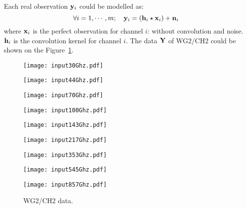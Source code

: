 Each real observation ${\bf y}_i$ could be modelled as:
\begin{equation}
\forall i=1,\cdots,m; \quad {\bf y}_i = \left( {\bf h}_i \star {\bf x}_i\right) + {\bf n}_i
\end{equation}
where ${\bf x}_i$ is the perfect observation for channel $i$: without convolution and noise. ${\bf h}_i$ is the convolution kernel for channel $i$. The data $\bf Y$ of WG2/CH2 could be shown 
on the Figure~\ref{fig:data_wg2}.

\begin{figure}[htb]
\vfill
\hspace{0.1in}
\begin{minipage}[b]{0.5\linewidth}
    \centerline{\texttt{[image: input30Ghz.pdf]}}
\end{minipage}
\hfill
\begin{minipage}[b]{0.5\linewidth}
    \centerline{\texttt{[image: input44Ghz.pdf]}}
\end{minipage}
\vfill
\hspace{0.1in}
\begin{minipage}[b]{0,5\linewidth}
    \centerline{\texttt{[image: input70Ghz.pdf]}}
\end{minipage}
\hfill
\begin{minipage}[b]{0,5\linewidth}
    \centerline{\texttt{[image: input100Ghz.pdf]}}
\end{minipage}
\vfill
\hspace{0.1in}
\begin{minipage}[b]{0,5\linewidth}
    \centerline{\texttt{[image: input143Ghz.pdf]}}
\end{minipage}
\hfill
\begin{minipage}[b]{0,5\linewidth}
    \centerline{\texttt{[image: input217Ghz.pdf]}}
\end{minipage}
\vspace{-0.1in} 
\vfill
\hspace{0.1in}
\begin{minipage}[b]{0,5\linewidth}
    \centerline{\texttt{[image: input353Ghz.pdf]}}
\end{minipage}
\hfill
\begin{minipage}[b]{0,5\linewidth}
    \centerline{\texttt{[image: input545Ghz.pdf]}}
\end{minipage}
\vspace{-0.1in} 
\vfill
\begin{minipage}[b]{1\linewidth}
    \centerline{\texttt{[image: input857Ghz.pdf]}}
\end{minipage}
\vspace{-0.1in} 

\caption{WG2/CH2 data.}  \label{fig:data_wg2}
\end{figure}

